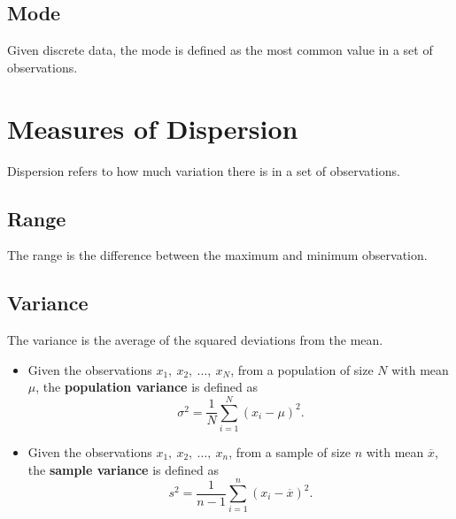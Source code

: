 \documentclass{article}
\begin{document}
\begin{multicols}{3}
\subsection{Mode}
Given discrete data, the mode is defined as the most common value in a set of observations.
\section{Measures of Dispersion}
Dispersion refers to how much variation there is in a set of observations.
\subsection{Range}
The range is the difference between the maximum and minimum observation.
\subsection{Variance}
The variance is the average of the squared deviations from the mean.
\begin{itemize}
    \item Given the observations \(x_1,\: x_2,\: \ldots,\: x_N\), from a population of size \(N\) with mean \(\mu\),
          the \textbf{population variance} is defined as
          \begin{equation*}
              \sigma^2 = \frac{1}{N} \sum_{i = 1}^N (x_i - \mu)^2.
          \end{equation*}
    \item Given the observations \(x_1,\: x_2,\: \ldots,\: x_n\), from a sample of size \(n\) with mean \(\overline{x}\),
          the \textbf{sample variance} is defined as
          \begin{equation*}
              s^2 = \frac{1}{n - 1} \sum_{i = 1}^n (x_i - \overline{x})^2.
          \end{equation*}
\end{itemize}

\end{multicols}
\end{document}
